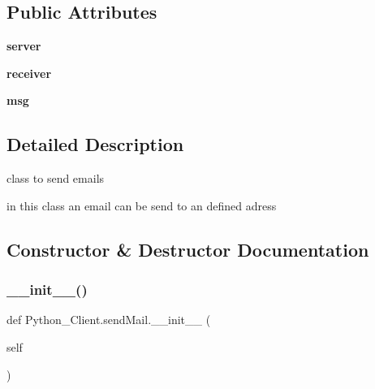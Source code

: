 \subsection*{Public Attributes}
\begin{DoxyCompactItemize}
\item 
\mbox{\label{class_python___client_1_1send_mail_a40f6fd6846557da60cf0c2e99847e550}} 
{\bfseries server}
\item 
\mbox{\label{class_python___client_1_1send_mail_a36ecd0c14687eec0c359e1d0a4abfd4b}} 
{\bfseries receiver}
\item 
\mbox{\label{class_python___client_1_1send_mail_a7b05c0042d54088efe3fb106fbcc821e}} 
{\bfseries msg}
\end{DoxyCompactItemize}


\subsection{Detailed Description}
class to send emails 

in this class an email can be send to an defined adress 

\subsection{Constructor \& Destructor Documentation}
\mbox{\label{class_python___client_1_1send_mail_abbe76ea5ec26636335cc40c07e1746c6}} 
\subsubsection{\texorpdfstring{\+\_\+\+\_\+init\+\_\+\+\_\+()}{\_\_init\_\_()}}
{\footnotesize\ttfamily def Python\+\_\+\+Client.\+send\+Mail.\+\_\+\+\_\+init\+\_\+\+\_\+ (\begin{DoxyParamCaption}\item[{}]{self }\end{DoxyParamCaption})}



